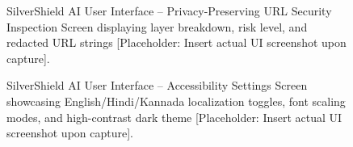 \documentclass[conference]{IEEEtran}
\begin{document}
\begin{figure}[!t]
\centering
{}
\caption{SilverShield AI User Interface -- Privacy-Preserving URL Security Inspection Screen displaying layer breakdown, risk level, and redacted URL strings [Placeholder: Insert actual UI screenshot upon capture].}
\label{fig:ui_url_analysis}
\end{figure}

\begin{figure}[!t]
\centering
{}
\caption{SilverShield AI User Interface -- Accessibility Settings Screen showcasing English/Hindi/Kannada localization toggles, font scaling modes, and high-contrast dark theme [Placeholder: Insert actual UI screenshot upon capture].}
\label{fig:ui_accessibility}
\end{figure}
\end{document}

